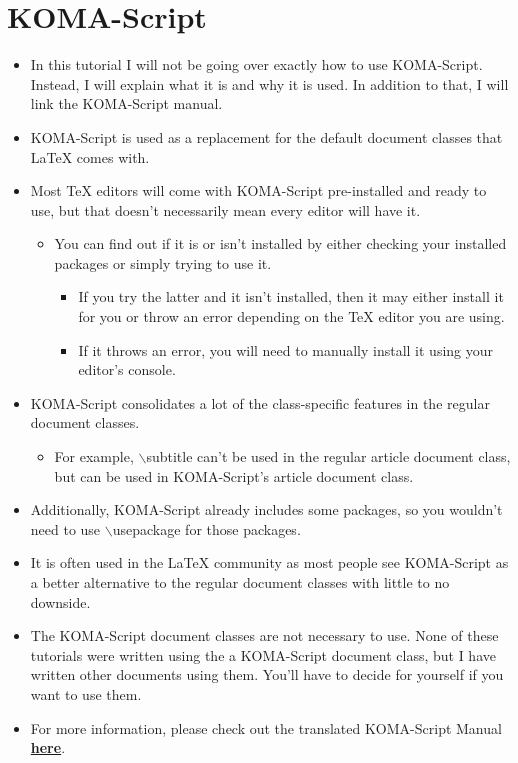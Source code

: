 \newpage
\section{KOMA-Script}
	\begin{itemize}
		\item In this tutorial I will not be going over exactly how to use KOMA-Script. Instead, I will explain what it is and why it is used. In addition to that, I will link the KOMA-Script manual.
		\item KOMA-Script is used as a replacement for the default document classes that \LaTeX{} comes with.
		\item Most \TeX{} editors will come with KOMA-Script pre-installed and ready to use, but that doesn\rq{}t necessarily mean every editor will have it.
		\begin{itemize}
			\item You can find out if it is or isn\rq{}t installed by either checking your installed packages or simply trying to use it.
			\begin{itemize}
				\item If you try the latter and it isn\rq{}t installed, then it may either install it for you or throw an error depending on the \TeX{} editor you are using.
				\item If it throws an error, you will need to manually install it using your editor's console.
			\end{itemize}
		\end{itemize}
		\item KOMA-Script consolidates a lot of the class-specific features in the regular document classes.
		\begin{itemize}
			\item For example, $\backslash$subtitle can\rq{}t be used in the regular article document class, but can be used in KOMA-Script's article document class.
		\end{itemize}
		\item Additionally, KOMA-Script already includes some packages, so you wouldn\rq{}t need to use $\backslash$usepackage for those packages.
		\item It is often used in the \LaTeX{} community as most people see KOMA-Script as a better alternative to the regular document classes with little to no downside.
		\item The KOMA-Script document classes are not necessary to use. None of these tutorials were written using the a KOMA-Script document class, but I have written other documents using them. You\rq{}ll have to decide for yourself if you want to use them.
		\item For more information, please check out the translated KOMA-Script Manual \href{http://texdoc.net/texmf-dist/doc/latex/koma-script/scrguien.pdf}{\textbf{here}}.
	\end{itemize}